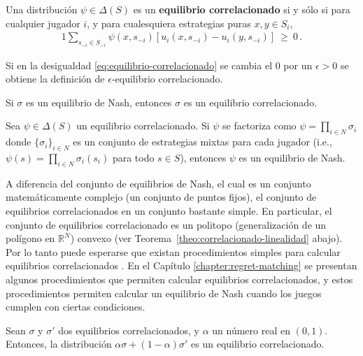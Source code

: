 \begin{definition}
\label{def:equilibrio-correlacionado}
Una distribución $\psi\in\Delta(S)$ es un \textbf{equilibrio correlacionado} si y sólo si para cualquier jugador $i$, y para cualesquiera estrategias puras $x, y \in S_i$,
\begin{alignat}{1}
\label{eq:equilibrio-correlacionado}
\sum_{s_{-i}\in S_{-i}} \psi(x,s_{-i}) [ u_i(x,s_{-i}) - u_i(y,s_{-i})]\ \geq\ 0 \,.
\end{alignat}
\end{definition}

Si en la desigualdad \eqref{eq:equilibrio-correlacionado} se cambia el $0$ por un $\epsilon > 0$ se obtiene la definición de $\epsilon$-equilibrio correlacionado.


\begin{theorem}
\label{theo:nash-correlacionado}
Si $\sigma$ es un equilibrio de Nash, entonces $\sigma$ es un equilibrio correlacionado.
\end{theorem}

\begin{theorem}
\label{theo:correlacionado-nash}
Sea $\psi\in\Delta(S)$ un equilibrio correlacionado. Si $\psi$ se factoriza como $\psi=\prod_{i\in N} \sigma_i$ donde $\{\sigma_i\}_{i\in N}$ es un conjunto de estrategias mixtas para cada jugador (i.e., $\psi(s)=\prod_{i \in N} \sigma_i(s_i)$ para todo $s\in S$), entonces $\psi$ es un equilibrio de Nash.
\end{theorem}

A diferencia del conjunto de equilibrios de Nash, el cual es un conjunto matemáticamente complejo (un conjunto de puntos fijos), el conjunto de equilibrios correlacionados en un conjunto bastante simple. En particular, el conjunto de equilibrios correlacionado es un politopo (generalización de un polígono en $\mathbb{R}^N$) convexo (ver Teorema~\ref{theo:correlacionado-linealidad} abajo). Por lo tanto puede esperarse que existan procedimientos simples para calcular equilibrios correlacionados  \cite{bib:correlated-equilibrium}. En el Capítulo \ref{chapter:regret-matching} se presentan algunos procedimientos que permiten calcular equilibrios correlacionados, y estos procedimientos permiten calcular un equilibrio de Nash cuando los juegos cumplen con ciertas condiciones.

\begin{theorem}
\label{theo:correlacionado-linealidad}
Sean $\sigma$ y $\sigma'$ dos equilibrios correlacionados, y $\alpha$ un número real en $(0,1)$. Entonces, la distribución $\alpha\sigma + (1-\alpha)\sigma'$ es un equilibrio correlacionado.
\end{theorem}

